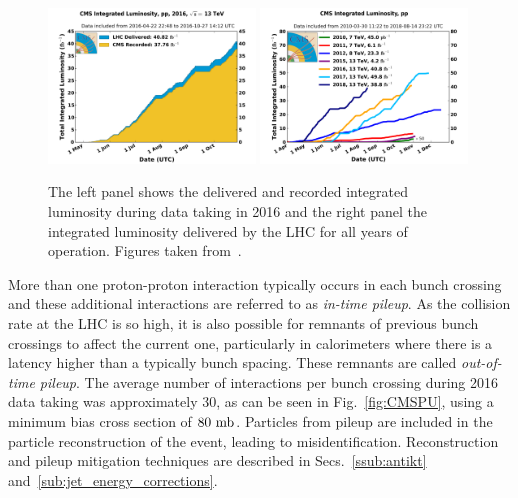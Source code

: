 \begin{figure}[htpb!]
	\centering
	\includegraphics[width=0.49\textwidth]{Figures/LHC2016Lumi}
	\includegraphics[width=0.49\textwidth]{Figures/LHCLumiAllYears}
	\caption[The left panel shows the delivered and recorded integrated luminosity during data taking in 2016 and the right panel the integrated luminosity delivered by the LHC for all years of operation.]{The left panel shows the delivered and recorded integrated luminosity during data taking in 2016 and the right panel the integrated luminosity delivered by the LHC for all years of operation. Figures taken from~\cite{CMS:CMSLumi}.}
	\label{fig:CMSLumi}
\end{figure}
More than one proton-proton interaction typically occurs in each bunch crossing and these additional interactions are referred to as \textit{in-time pileup}.
As the collision rate at the LHC is so high, it is also possible for remnants of previous bunch crossings to affect the current one, particularly in calorimeters where there is a latency higher than a typically bunch spacing.
These remnants are called \textit{out-of-time pileup}.
The average number of interactions per bunch crossing during 2016 data taking was approximately 30, as can be seen in Fig.~\ref{fig:CMSPU}, using a minimum bias cross section of $80\mathrm{~mb}^{}$.
Particles from pileup are included in the particle reconstruction of the event, leading to misidentification.
Reconstruction and pileup mitigation techniques are described in Secs.~\ref{ssub:antikt} and~\ref{sub:jet_energy_corrections}.
